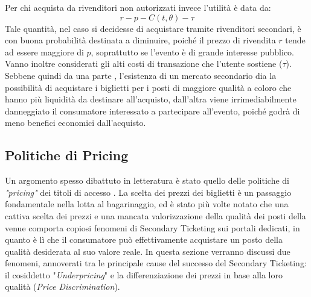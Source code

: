 Per chi acquista da rivenditori non autorizzati invece l'utilità è data da: 
\begin{equation}
	r - p - C(t, \theta) - \tau
\end{equation}
Tale quantità, nel caso si decidesse di acquistare tramite rivenditori secondari, è con buona probabilità destinata a diminuire, poiché il prezzo di rivendita $r$ tende ad essere maggiore di $p$, soprattutto se l'evento è di grande interesse pubblico. Vanno inoltre considerati gli alti costi di transazione che l'utente sostiene ($\tau$). Sebbene quindi da una parte , l'esistenza di un mercato secondario dia la possibilità di acquistare i biglietti per i posti di maggiore qualità a coloro che hanno più liquidità da destinare all'acquisto, dall'altra viene irrimediabilmente danneggiato il consumatore interessato a partecipare all'evento, poiché godrà di meno benefici economici dall'acquisto. 

\subsection{Politiche di Pricing} \label{price}
Un argomento spesso dibattuto in letteratura è stato quello delle politiche di \textit{"pricing"} dei titoli di accesso \cite{courty2012impact, bhave2017primary, esteves2009price, courty2011unpriced}. La scelta dei prezzi dei biglietti è un passaggio fondamentale nella lotta al bagarinaggio, ed è stato più volte notato che una cattiva scelta dei prezzi e una mancata valorizzazione della qualità dei posti della venue comporta copiosi fenomeni di Secondary Ticketing sui portali dedicati, in quanto è lì che il consumatore può effettivamente acquistare un posto della qualità desiderata al suo valore reale. In questa sezione verranno discussi due fenomeni, annoverati tra le principale cause del successo del Secondary Ticketing: il cosiddetto "\textit{Underpricing}" e la differenziazione dei prezzi in base alla loro qualità (\textit{Price Discrimination}).

